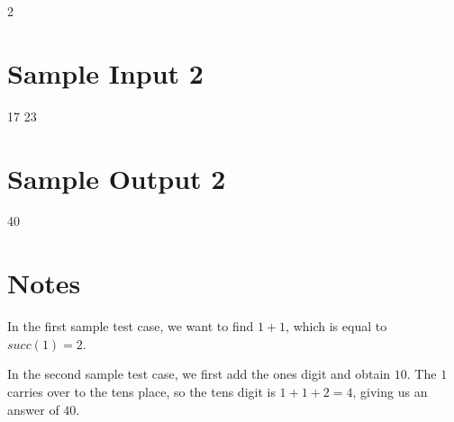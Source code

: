     2

\section{Sample Input 2}

    17
    23

\section{Sample Output 2}

    40

\section{Notes}

In the first sample test case, we want to find $1 + 1$, which is equal to $succ(1) = 2$.

In the second sample test case, we first add the ones digit and obtain $10$. The $1$ carries over
to the tens place, so the tens digit is $1 + 1 + 2 = 4$, giving us an answer of $40$.